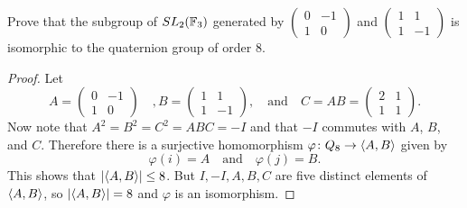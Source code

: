  Prove that the subgroup of $SL_2(\mathbb{F}_3)$ generated by
$\begin{pmatrix} 0 & -1 \\ 1 & 0 \end{pmatrix}$ and
$\begin{pmatrix} 1 & 1 \\ 1 & -1 \end{pmatrix}$ is isomorphic to the
quaternion group of order $8$.
\begin{proof}
  Let
  \begin{equation*}
    A = \begin{pmatrix} 0 & -1 \\ 1 & 0 \end{pmatrix}
    \quad,
    B = \begin{pmatrix} 1 & 1 \\ 1 & -1 \end{pmatrix},
    \quad\text{and}\quad
    C = AB = \begin{pmatrix} 2 & 1 \\ 1 & 1 \end{pmatrix}.
  \end{equation*}
  Now note that $A^2 = B^2 = C^2 = ABC = -I$ and that $-I$ commutes
  with $A$, $B$, and $C$. Therefore there is a surjective homomorphism
  $\varphi\colon Q_8\to\langle{A,B}\rangle$ given by
  \begin{equation*}
    \varphi(i) = A \quad\text{and}\quad \varphi(j) = B.
  \end{equation*}
  This shows that $\lvert{\langle{A,B}\rangle}\rvert\leq8$. But $I, -I, A, B, C$ are
  five distinct elements of $\langle{A,B}\rangle$, so $\lvert{\langle{A,B}\rangle}\rvert = 8$ and
  $\varphi$ is an isomorphism.
\end{proof}

